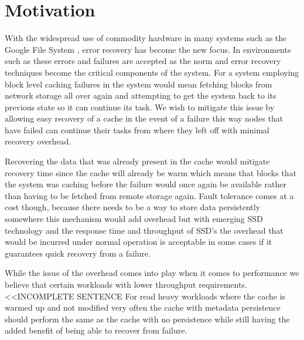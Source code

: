 \section{Motivation}
\label{sec:motivation}

With the widespread use of commodity hardware in many systems such as
the Google File System \cite{GFS}, error recovery has become the new
focus. In environments such as these errors and failures are accepted
as the norm and error recovery techniques become the critical
components of the system. For a system employing block level caching
failures in the system would mean fetching blocks from network storage
all over again and attempting to get the system back to its previous
state so it can continue its task. We wish to mitigate this issue by
allowing easy recovery of a cache in the event of a failure this way
nodes that have failed can continue their tasks from where they left
off with minimal recovery overhead.

Recovering the data that was already present in the cache would
mitigate recovery time since the cache will already be warm which
means that blocks that the system was caching before the failure would
once again be available rather than having to be fetched from remote
storage again. Fault tolerance comes at a cost though, because there
needs to be a way to store data persistently somewhere this mechanism
would add overhead but with emerging SSD technology and the response
time and throughput of SSD's the overhead that would be incurred under
normal operation is acceptable in some cases if it guarantees quick
recovery from a failure.

While the issue of the overhead comes into play when it comes to
performance we believe that certain workloads with lower throughput
requirements. <<INCOMPLETE SENTENCE For read heavy workloads where the cache is warmed up
and not modified very often the cache with metadata persistence should
perform the same as the cache with no persistence while still having
the added benefit of being able to recover from failure.
